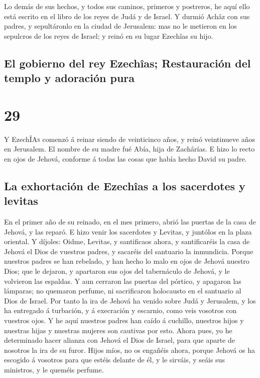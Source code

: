  Lo demás de sus hechos, y todos sus caminos, primeros y
postreros, he aquí ello está escrito en el libro de los reyes de Judá y
de Israel.  Y durmió Achâz con sus padres, y sepultáronlo
en la ciudad de Jerusalem: mas no le metieron en los sepulcros de los
reyes de Israel; y reinó en su lugar Ezechîas su hijo.

\hypertarget{el-gobierno-del-rey-ezechuxeeas-restauraciuxf3n-del-templo-y-adoraciuxf3n-pura}{%
\subsection{El gobierno del rey Ezechîas; Restauración del templo y
adoración
pura}\label{el-gobierno-del-rey-ezechuxeeas-restauraciuxf3n-del-templo-y-adoraciuxf3n-pura}}

\hypertarget{section-14-29}{%
\section{29}\label{section-14-29}}

 Y EzechÎ\textsc{As} comenzó á reinar siendo de
veinticinco años, y reinó veintinueve años en Jerusalem. El nombre de su
madre fué Abía, hija de Zachârías.  E hizo lo recto en
ojos de Jehová, conforme á todas las cosas que había hecho David su
padre.

\hypertarget{la-exhortaciuxf3n-de-ezechuxeeas-a-los-sacerdotes-y-levitas}{%
\subsection{La exhortación de Ezechîas a los sacerdotes y
levitas}\label{la-exhortaciuxf3n-de-ezechuxeeas-a-los-sacerdotes-y-levitas}}

 En el primer año de su reinado, en el mes primero, abrió
las puertas de la casa de Jehová, y las reparó.  E hizo
venir los sacerdotes y Levitas, y juntólos en la plaza oriental.
 Y díjoles: Oidme, Levitas, y santificaos ahora, y
santificaréis la casa de Jehová el Dios de vuestros padres, y sacaréis
del santuario la inmundicia.  Porque nuestros padres se
han rebelado, y han hecho lo malo en ojos de Jehová nuestro Dios; que le
dejaron, y apartaron sus ojos del tabernáculo de Jehová, y le volvieron
las espaldas.  Y aun cerraron las puertas del pórtico, y
apagaron las lámparas; no quemaron perfume, ni sacrificaron holocausto
en el santuario al Dios de Israel.  Por tanto la ira de
Jehová ha venido sobre Judá y Jerusalem, y los ha entregado á turbación,
y á execración y escarnio, como veis vosotros con vuestros ojos.
 Y he aquí nuestros padres han caído á cuchillo, nuestros
hijos y nuestras hijas y nuestras mujeres son cautivas por esto.
 Ahora pues, yo he determinado hacer alianza con Jehová
el Dios de Israel, para que aparte de nosotros la ira de su furor.
 Hijos míos, no os engañéis ahora, porque Jehová os ha
escogido á vosotros para que estéis delante de él, y le sirváis, y seáis
sus ministros, y le queméis perfume.

